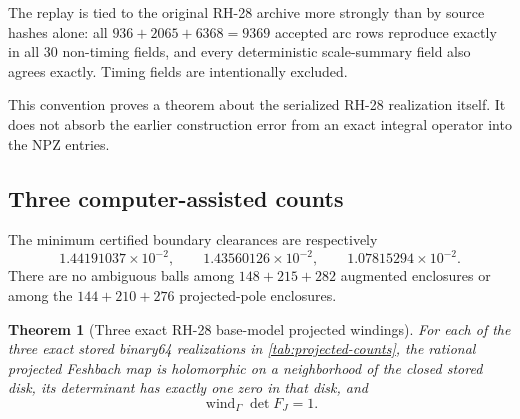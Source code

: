 \documentclass[11pt]{article}
\newtheorem{theorem}{Theorem}[section]
\theoremstyle{definition}
\theoremstyle{remark}
\newcommand{\wind}{\operatorname{wind}}
\begin{document}
The replay is tied to the original RH-28 archive more strongly than by
source hashes alone: all $936+2065+6368=9369$ accepted arc rows reproduce
exactly in all 30 non-timing fields, and every deterministic scale-summary
field also agrees exactly.  Timing fields are intentionally excluded.

This convention proves a theorem about the serialized RH-28 realization itself.
It does not absorb the earlier construction error from an exact integral
operator into the NPZ entries.

\subsection{Three computer-assisted counts}

\begin{table}[H]
\centering
\caption{Verified projected disk counts.  Here $r_{\rm in}^+$ is the
largest upper modulus among inside augmented balls, $r_{\rm out}^-$ the
smallest lower modulus among outside augmented balls, and $p_{\rm out}^-$
the corresponding minimum for all projected Hessenberg poles.}
\label{tab:projected-counts}
\scriptsize
{}
\end{table}

The minimum certified boundary clearances are respectively
\begin{equation}
 1.44191037\times10^{-2},\qquad
 1.43560126\times10^{-2},\qquad
 1.07815294\times10^{-2}.
 \label{eq:count-clearances}
\end{equation}
There are no ambiguous balls among $148+215+282$ augmented enclosures or
among the $144+210+276$ projected-pole enclosures.

\begin{theorem}[Three exact RH-28 base-model projected windings]
\label{thm:three-projected-counts}
For each of the three exact stored binary64 realizations in
\cref{tab:projected-counts}, the rational projected Feshbach map is
holomorphic on a neighborhood of the closed stored disk, its determinant
has exactly one zero in that disk, and
\begin{equation}
 \wind_\Gamma\det F_J=1.
 \label{eq:three-windings}
\end{equation}
\end{theorem}
\end{document}
